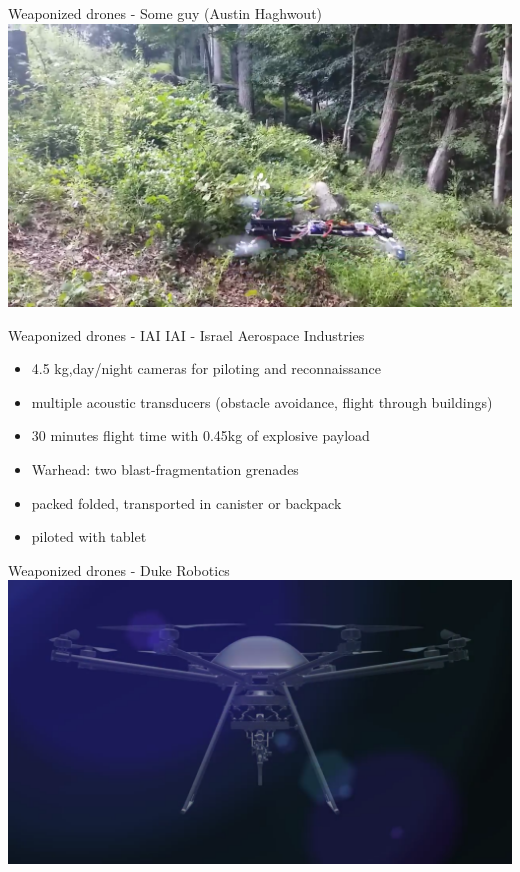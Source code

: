 \documentclass[aspectratio=169]{beamer}
\begin{document}
\begin{frame}{Weaponized drones - Some guy (Austin Haghwout)}
\centering
            \href{run:./videos/flying_gun.mp4?autostart}
            {\includegraphics[width=.95\linewidth]{images/flying_gun.png}}
\end{frame}

\begin{frame}{Weaponized drones - IAI}
IAI - Israel Aerospace Industries\\
\begin{itemize}
	\item 4.5 kg,day/night cameras for piloting and reconnaissance
	\item multiple acoustic transducers (obstacle avoidance, flight through buildings)
	\item 30 minutes flight time with 0.45kg of explosive payload
	\item Warhead: two blast-fragmentation grenades
	\item packed folded, transported in canister or backpack
	\item piloted with tablet
\end{itemize}

\tiny{\color{gray}{http://defense-update.com/20160216\_rotem.html}}
\end{frame}

\begin{frame}{Weaponized drones - Duke Robotics}
\href{run:./videos/duke_robotics.mp4?autostart}
            {\includegraphics[width=.95\linewidth]{images/duke_robotics.png}}
\tiny{\color{gray}{https://dukeroboticsys.com/invest/}}
\end{frame}
\end{document}

